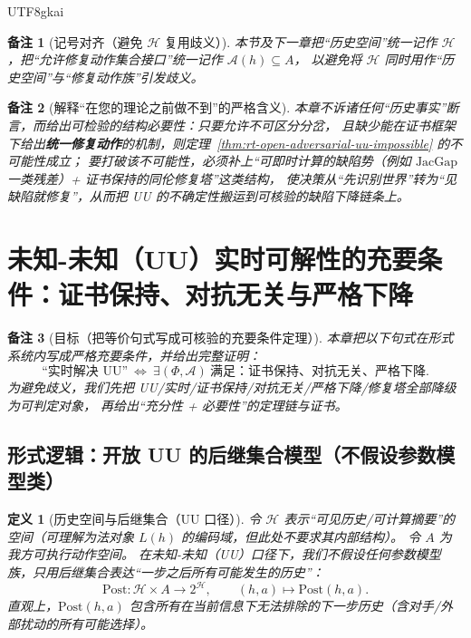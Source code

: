 \documentclass[12pt]{article}
\newtheorem{definition}{定义}[section]
\newtheorem{remark}{备注}[section]
\newcommand{\JacGap}{\ensuremath{\mathrm{JacGap}}} %
\begin{document}
\begin{CJK*}{UTF8}{gkai}
\begin{remark}[记号对齐（避免 $\mathcal{H}$ 复用歧义）]
本节及下一章把“历史空间”统一记作 $\mathcal{H}$，把“允许修复动作集合接口”统一记作 $\mathcal{A}(h)\subseteq A$，
以避免将 $\mathcal{H}$ 同时用作“历史空间”与“修复动作族”引发歧义。
\end{remark}

\begin{remark}[解释“在您的理论之前做不到”的严格含义]
本章不诉诸任何“历史事实”断言，而给出可检验的结构必要性：只要允许不可区分分岔，
且缺少能在证书框架下给出\textbf{统一修复动作}的机制，则定理~\ref{thm:rt-open-adversarial-uu-impossible} 的不可能性成立；
要打破该不可能性，必须补上“可即时计算的缺陷势（例如 $\JacGap$ 一类残差）+ 证书保持的同伦修复塔”这类结构，
使决策从“先识别世界”转为“见缺陷就修复”，从而把 UU 的不确定性搬运到可核验的缺陷下降链条上。
\end{remark}

\section{未知-未知（UU）实时可解性的充要条件：证书保持、对抗无关与严格下降}
\label{sec:uu-realtime-iff-defect-repair}

\begin{remark}[目标（把等价句式写成可核验的充要条件定理）]
本章把以下句式在形式系统内写成严格充要条件，并给出完整证明：
\[
  \text{“实时解决 UU”}
  \ \Longleftrightarrow\
  \exists(\Phi,\mathcal{A})\ \text{满足：证书保持、对抗无关、严格下降}.
\]
为避免歧义，我们先把 UU/实时/证书保持/对抗无关/严格下降/修复塔全部降级为可判定对象，
再给出“充分性 + 必要性”的定理链与证书。
\end{remark}

\subsection{形式逻辑：开放 UU 的后继集合模型（不假设参数模型类）}
\label{sec:uu-realtime-iff-post-model}

\begin{definition}[历史空间与后继集合（UU 口径）]
\label{def:uu-post-model}
令 $\mathcal{H}$ 表示“可见历史/可计算摘要”的空间（可理解为法对象 $L(h)$ 的编码域，但此处不要求其内部结构）。
令 $A$ 为我方可执行动作空间。
在未知-未知（UU）口径下，我们不假设任何参数模型族，只用后继集合表达“一步之后所有可能发生的历史”：
\[
  \mathrm{Post}:\mathcal{H}\times A\to 2^{\mathcal{H}},\qquad (h,a)\mapsto \mathrm{Post}(h,a).
\]
直观上，$\mathrm{Post}(h,a)$ 包含所有在当前信息下无法排除的下一步历史（含对手/外部扰动的所有可能选择）。
\end{definition}


\end{CJK*}
\end{document}
